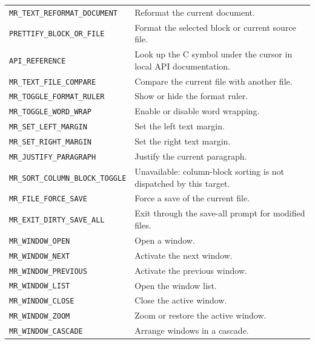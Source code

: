 \documentclass[a4paper,10pt,twoside,openany]{book}
\newenvironment{mrmacextension}{\begin{changebar}}{\end{changebar}}
\begin{document}
\begin{mrmacextension}
\begin{longtable}{@{}L{0.50\textwidth}@{\hspace{0.8em}}L{0.40\textwidth}@{}}
\texttt{MR\_TEXT\_REFORMAT\_DOCUMENT} & Reformat the current document. \\
\texttt{PRETTIFY\_BLOCK\_OR\_FILE} & Format the selected block or current source file. \\
\texttt{API\_REFERENCE} & Look up the C symbol under the cursor in local API documentation. \\
\texttt{MR\_TEXT\_FILE\_COMPARE} & Compare the current file with another file. \\
\texttt{MR\_TOGGLE\_FORMAT\_RULER} & Show or hide the format ruler. \\
\texttt{MR\_TOGGLE\_WORD\_WRAP} & Enable or disable word wrapping. \\
\texttt{MR\_SET\_LEFT\_MARGIN} & Set the left text margin. \\
\texttt{MR\_SET\_RIGHT\_MARGIN} & Set the right text margin. \\
\texttt{MR\_JUSTIFY\_PARAGRAPH} & Justify the current paragraph. \\
\texttt{MR\_SORT\_COLUMN\_BLOCK\_TOGGLE} & Unavailable: column-block sorting is not dispatched by this target. \\
\texttt{MR\_FILE\_FORCE\_SAVE} & Force a save of the current file. \\
\texttt{MR\_EXIT\_DIRTY\_SAVE\_ALL} & Exit through the save-all prompt for modified files. \\
\texttt{MR\_WINDOW\_OPEN} & Open a window. \\
\texttt{MR\_WINDOW\_NEXT} & Activate the next window. \\
\texttt{MR\_WINDOW\_PREVIOUS} & Activate the previous window. \\
\texttt{MR\_WINDOW\_LIST} & Open the window list. \\
\texttt{MR\_WINDOW\_CLOSE} & Close the active window. \\
\texttt{MR\_WINDOW\_ZOOM} & Zoom or restore the active window. \\
\texttt{MR\_WINDOW\_CASCADE} & Arrange windows in a cascade. \\

\end{longtable}
\end{mrmacextension}
\end{document}
